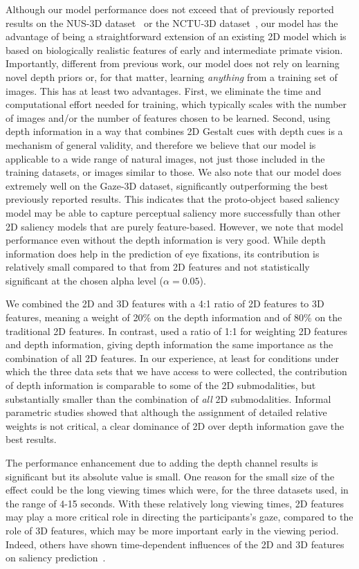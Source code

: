 Although our model performance does not exceed that of previously reported results on the NUS-3D dataset~\citep{Lang_etal12} or the NCTU-3D dataset~\citep{Ma_Hang15}, our model has the advantage of being
a straightforward extension of an  existing 2D model \citep{Russell_etal14} which is based on biologically realistic features of early and intermediate primate vision. Importantly, different from previous work, our model does not rely on learning novel depth priors or, for that matter, learning {\em
  anything} from a training set of images. This has at least two advantages. First, we eliminate the time and computational effort needed for training, which typically scales with the number of images and/or the number of features chosen to be learned. Second, using depth information in a way that combines 2D Gestalt cues with depth cues is a mechanism of general validity, and therefore we believe that our model is applicable to a wide range of natural images, not just those included in the training datasets, or images similar to those. We also note that our model does extremely well on the Gaze-3D dataset, significantly outperforming the best previously reported results. This indicates that the proto-object based saliency model may be able to capture perceptual saliency more successfully than other 2D saliency models that are purely feature-based. However, we note that model performance even without the depth information is very good. While depth information does help in the prediction of eye fixations, its contribution is relatively small compared to that from 2D features and not statistically significant at the chosen alpha level ($\alpha = 0.05$).

We combined the 2D and 3D features with a 4:1 ratio of 2D features to
3D features, meaning a weight of 20\% on the depth information and 
of 80\% on the traditional 2D features. In contrast, \cite{Wang_etal13} used a ratio of 1:1 for weighting 2D features
and depth information, giving depth information the same importance as the combination of all  2D features. In our experience, at least for conditions under which the three data sets that we have access to were collected, the contribution of depth information is comparable to some of the 2D submodalities, but substantially smaller than the combination of {\em all} 2D submodalities. Informal parametric studies showed that although the assignment of  detailed relative weights is not critical, a clear dominance of 2D over depth information gave the best results. 

The performance enhancement due to adding the depth channel results is
significant but its absolute value is small.  One reason for the small
size of the effect could be the long viewing times which were, for the three datasets used, in the range of 4-15 seconds. With these relatively long viewing times, 2D features may play a more critical
role in directing the participants's gaze, compared to the role of 3D
features, which may be more important early in the viewing period. Indeed, others have shown time-dependent influences of the 2D and 3D features on saliency prediction~\citep{Gautier_LeMeur12}.

